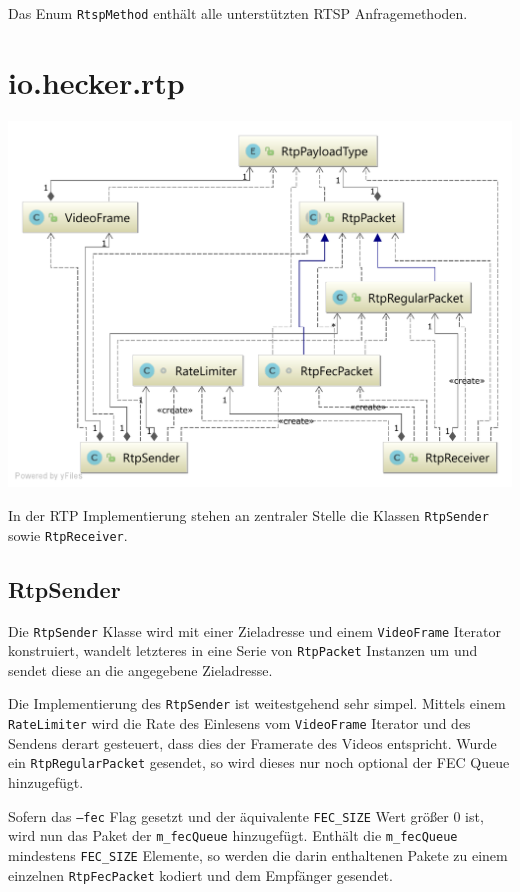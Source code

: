 \documentclass[a4paper,12pt]{article}
\begin{document}
Das Enum \texttt{RtspMethod} enthält alle unterstützten RTSP Anfragemethoden.

\clearpage
\section{io.hecker.rtp}

\includegraphics[width=\textwidth]{assets/rtp.pdf}

In der RTP \cite{RFC3550} Implementierung stehen an zentraler Stelle die Klassen \texttt{RtpSender} sowie \texttt{RtpReceiver}.

\subsection{RtpSender}

Die \texttt{RtpSender} Klasse wird mit einer Zieladresse und einem \texttt{VideoFrame} Iterator konstruiert, wandelt letzteres in eine Serie von \texttt{RtpPacket} Instanzen um und sendet diese an die angegebene Zieladresse.

Die Implementierung des \texttt{RtpSender} ist weitestgehend sehr simpel.
Mittels einem \texttt{RateLimiter} wird die Rate des Einlesens vom \texttt{VideoFrame} Iterator und des Sendens derart gesteuert, dass dies der Framerate des Videos entspricht.
Wurde ein \texttt{RtpRegularPacket} gesendet, so wird dieses nur noch optional der FEC Queue hinzugefügt.

Sofern das \texttt{--fec} Flag gesetzt und der äquivalente \texttt{FEC\_SIZE} Wert größer $0$ ist, wird nun das Paket der \texttt{m\_fecQueue} hinzugefügt.
Enthält die \texttt{m\_fecQueue} mindestens \texttt{FEC\_SIZE} Elemente, so werden die darin enthaltenen Pakete zu einem einzelnen \texttt{RtpFecPacket} kodiert und dem Empfänger gesendet.
\end{document}
